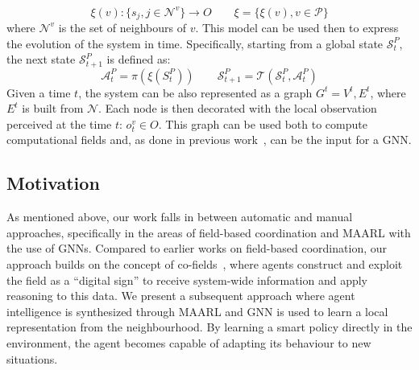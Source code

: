 \begin{equation*}
\xi(v): \{s_j, j \in \mathcal{N}^v\} \rightarrow O
\qquad
\xi = \{\xi(v), v \in \mathcal{P}\}
\end{equation*}
where $\mathcal{N}^v$ is the set of neighbours of $v$.
%
This model can be used then to express the evolution of the system in time.
Specifically, starting from a global state $\mathcal{S}^P_t$, the next state $\mathcal{S}^P_{t+1}$ is defined as:
\begin{equation*}
\mathcal{A}^P_t = \pi(\xi(S^P_t))
\qquad
\mathcal{S}^P_{t+1} = \mathcal{T}(\mathcal{S}^P_t, \mathcal{A}^P_t)
\end{equation*}
Given a time $t$, the system can be also represented as a graph $G^t = {V^t, E^t}$, 
  where $E^t$ is built from $\mathcal{N}$.
  Each node is then decorated with the local observation perceived at the time $t$: $o^v_t \in O$. 
%
This graph can be used both to compute computational fields and, as done in previous work~\cite{DBLP:conf/corl/TolstayaGPP0R19,tolstaya2020learning,DBLP:conf/icra/GosrichMLPYR022}, can be the input for a GNN.
\subsection{Motivation}
%
As mentioned above, our work falls in between automatic and manual approaches, specifically in the areas of field-based coordination and \ac{MAARL} with the use of \acp{GNN}.
%
Compared to earlier works on field-based coordination, 
 our approach builds on the concept of co-fields~\cite{DBLP:journals/pervasive/MameiZL04}, 
 where agents construct and exploit the field as a ``digital sign'' \cite{DBLP:journals/ijaci/CastelfranchiPT10} to receive system-wide information and apply reasoning to this data.
%  
We present a subsequent approach where agent intelligence is synthesized through \ac{MAARL} and \ac{GNN} is used to learn a local representation from the neighbourhood.
%
By learning a smart policy directly in the environment, the agent becomes capable of adapting its behaviour to new situations.


